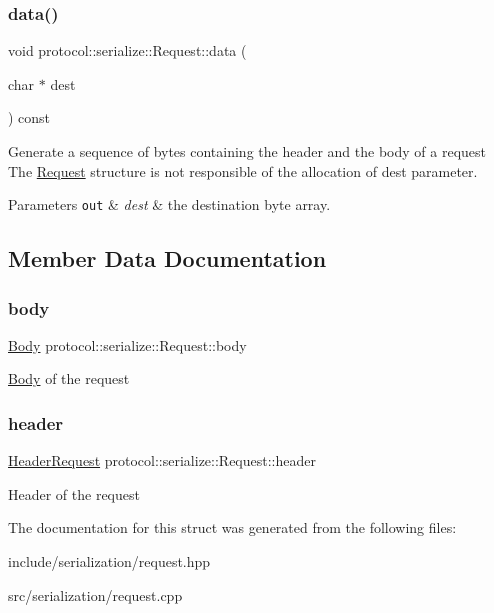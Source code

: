 \subsubsection{\texorpdfstring{data()}{data()}}
{\footnotesize\ttfamily void protocol\+::serialize\+::\+Request\+::data (\begin{DoxyParamCaption}\item[{char $\ast$}]{dest }\end{DoxyParamCaption}) const}



Generate a sequence of bytes containing the header and the body of a request The \hyperlink{structprotocol_1_1serialize_1_1_request}{Request} structure is not responsible of the allocation of dest parameter. 


\begin{DoxyParams}[1]{Parameters}
\mbox{\tt out}  & {\em dest} & the destination byte array. \\
\hline
\end{DoxyParams}


\subsection{Member Data Documentation}
\mbox{\label{structprotocol_1_1serialize_1_1_request_a657ae52f93238a2b11a8c1d65c89d358}} 
\subsubsection{\texorpdfstring{body}{body}}
{\footnotesize\ttfamily \hyperlink{classprotocol_1_1serialize_1_1_body}{Body} protocol\+::serialize\+::\+Request\+::body}

\hyperlink{classprotocol_1_1serialize_1_1_body}{Body} of the request \mbox{\label{structprotocol_1_1serialize_1_1_request_a9c9ea2d1e0b92441c22ac9c10a9f2e2e}} 
\subsubsection{\texorpdfstring{header}{header}}
{\footnotesize\ttfamily \hyperlink{structprotocol_1_1serialize_1_1_header_request}{Header\+Request} protocol\+::serialize\+::\+Request\+::header}

Header of the request 

The documentation for this struct was generated from the following files\+:\begin{DoxyCompactItemize}
\item 
include/serialization/request.\+hpp\item 
src/serialization/request.\+cpp\end{DoxyCompactItemize}
